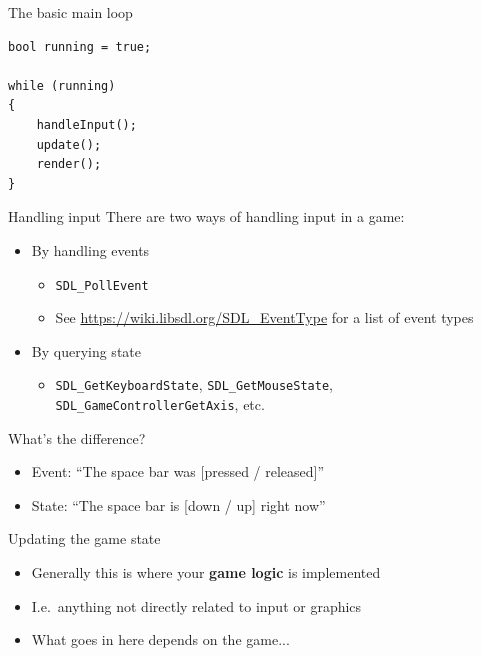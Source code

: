 \begin{frame}[fragile]{The basic main loop}
    \begin{lstlisting}
bool running = true;

while (running)
{
    handleInput();
    update();
    render();
}
    \end{lstlisting}
\end{frame}

\begin{frame}{Handling input}
    There are two ways of handling input in a game:
    \begin{itemize}
        \item By handling events
            \begin{itemize}
                \item \lstinline{SDL_PollEvent}
                \item See \url{https://wiki.libsdl.org/SDL_EventType} for a list of event types
            \end{itemize}
        \item By querying state
            \begin{itemize}
                \item \lstinline{SDL_GetKeyboardState}, \lstinline{SDL_GetMouseState},
                    \lstinline{SDL_GameControllerGetAxis}, etc.
            \end{itemize}
    \end{itemize}
    What's the difference?
    \begin{itemize}
        \item Event: ``The space bar was [pressed / released]''
        \item State: ``The space bar is [down / up] right now''
    \end{itemize}
\end{frame}

\begin{frame}{Updating the game state}
    \begin{itemize}
        \item Generally this is where your \textbf{game logic} is implemented
        \item I.e.\ anything not directly related to input or graphics
        \item What goes in here depends on the game...
    \end{itemize}
\end{frame}

